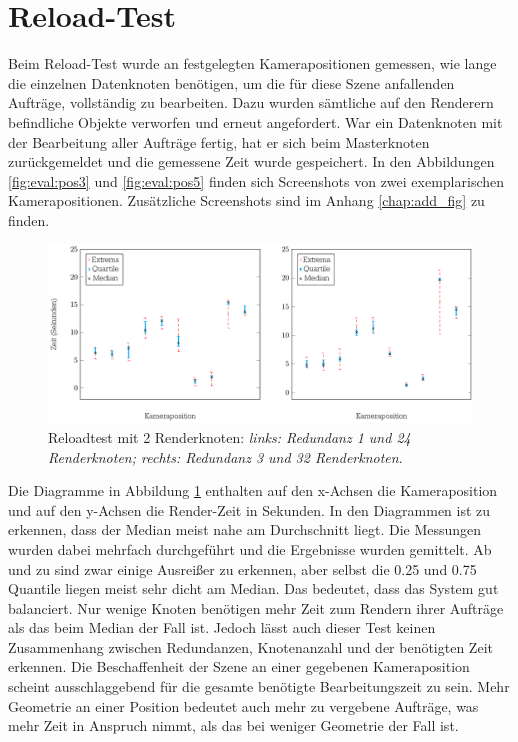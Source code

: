 \section{Reload-Test}
\label{sec:eval:reload}
Beim Reload-Test wurde an festgelegten Kamerapositionen gemessen, wie lange die einzelnen Datenknoten benötigen, um die für diese Szene anfallenden Aufträge, vollständig zu bearbeiten. Dazu wurden sämtliche auf den Renderern befindliche Objekte verworfen und erneut angefordert. War ein Datenknoten mit der Bearbeitung aller Aufträge fertig, hat er sich beim Masterknoten zurückgemeldet und die gemessene Zeit wurde gespeichert. In den Abbildungen \ref{fig:eval:pos3} und \ref{fig:eval:pos5} finden sich Screenshots von zwei exemplarischen Kamerapositionen. Zusätzliche Screenshots sind im Anhang \ref{chap:add_fig} zu finden.\\
\begin{figure}
\centering
\includegraphics[scale=0.75]{images/diag_reload.pdf}
  \caption{\label{fig:eval:reload}Reloadtest mit 2 Renderknoten: \textit{links: Redundanz 1 und 24 Renderknoten; rechts: Redundanz 3 und 32 Renderknoten}.}
\end{figure}
Die Diagramme in Abbildung \ref{fig:eval:reload} enthalten auf den x-Achsen die Kameraposition und auf den y-Achsen die Render-Zeit in Sekunden. In den Diagrammen ist zu erkennen, dass der Median meist nahe am Durchschnitt liegt. Die Messungen wurden dabei mehrfach durchgeführt und die Ergebnisse wurden gemittelt. Ab und zu sind zwar einige Ausreißer zu erkennen, aber selbst die 0.25 und 0.75 Quantile liegen meist sehr dicht am Median. Das bedeutet, dass das System gut balanciert. Nur wenige Knoten benötigen mehr Zeit zum Rendern ihrer Aufträge als das beim Median der Fall ist. Jedoch lässt auch dieser Test keinen Zusammenhang zwischen Redundanzen, Knotenanzahl und der benötigten Zeit erkennen. Die Beschaffenheit der Szene an einer gegebenen Kameraposition scheint ausschlaggebend für die gesamte benötigte Bearbeitungszeit zu sein. Mehr Geometrie an einer Position bedeutet auch mehr zu vergebene Aufträge, was mehr Zeit in Anspruch nimmt, als das bei weniger Geometrie der Fall ist.
